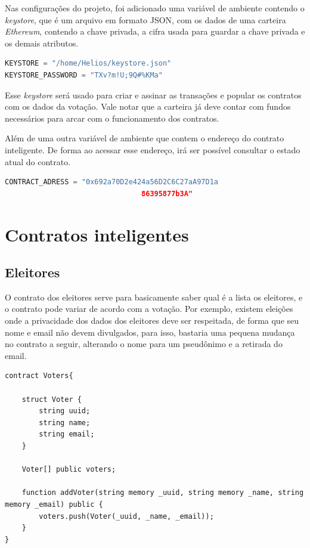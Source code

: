 \documentclass{ufsctex/ufsctex}
\begin{document}
Nas configurações do projeto, foi adicionado uma variável de ambiente contendo
o \textit{keystore}, que é um arquivo em formato JSON, com os dados de uma
carteira \textit{Ethereum}, contendo a chave privada, a cifra usada para
guardar a chave privada e os demais atributos.

\begin{lstlisting}[language=Python, numbers=none]
KEYSTORE = "/home/Helios/keystore.json"
KEYSTORE_PASSWORD = "TXv?m!U;9Q#%KMa"
\end{lstlisting}

Esse \textit{keystore} será usado para criar e assinar as transações e popular
os contratos com os dados da votação. Vale notar que a carteira já deve contar
com fundos necessários para arcar com o funcionamento dos contratos.

Além de uma outra variável de ambiente que contem o endereço do contrato
inteligente. De forma ao acessar esse endereço, irá ser possível consultar o
estado atual do contrato.

\begin{lstlisting}[language=Python, numbers=none]
	CONTRACT_ADRESS = "0x692a70D2e424a56D2C6C27aA97D1a
								86395877b3A"
\end{lstlisting}

\section{Contratos inteligentes}

\subsection{Eleitores}

O contrato dos eleitores serve para basicamente saber qual é a lista os
eleitores, e o contrato pode variar de acordo com a votação.  Por exemplo,
existem eleições onde a privacidade dos dados dos eleitores deve ser
respeitada, de forma que seu nome e email não devem divulgados, para isso,
bastaria uma pequena mudança no contrato a seguir, alterando o nome para um
pseudônimo e a retirada do email.

\begin{lstlisting}[language=Solidity]
contract Voters{
    
    struct Voter {
        string uuid;
        string name;
        string email;
    }
    
    Voter[] public voters;
    
    function addVoter(string memory _uuid, string memory _name, string memory _email) public {
        voters.push(Voter(_uuid, _name, _email));
    }
}
\end{lstlisting}
\end{document}
